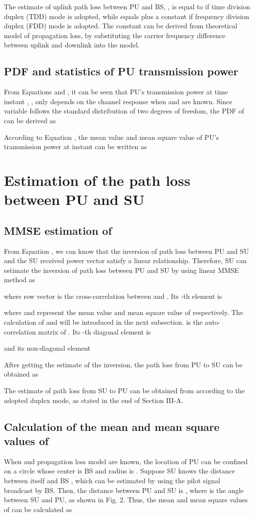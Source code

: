 \documentclass[conference]{IEEEtran}
\begin{document}
The estimate of uplink path loss between PU and BS, ,
is equal to  if time division duplex (TDD) mode is
adopted, while  equals  plus a constant if
frequency division duplex (FDD) mode is adopted. The constant can be
derived from theoretical model of propagation loss, by substituting
the carrier frequency difference between uplink and downlink into
the model.
\subsection{PDF and statistics of PU transmission power }
From Equations  and , it can be seen that PU's
transmission power at time instant , , only depends on
the channel response  when  and  are
known. Since variable  follows the
standard  distribution of two degrees of freedom, the PDF
of  can be derived as

According to Equation , the mean value  and mean
square value  of PU's transmission power at
instant  can be written as


\section{Estimation of the path loss between PU and SU}
\subsection{MMSE estimation of }
From Equation , we can know that the inversion of path loss
between PU and SU  and the SU received power vector 
satisfy a linear relationship. Therefore, SU can estimate the
inversion of path loss between PU and SU  by using linear MMSE
method \cite{c8} as

where  row vector  is the cross-correlation
between  and . Its -th element is

where  and  represent the mean value and
mean square value of  respectively. The calculation of 
and  will be introduced in the next subsection.
 is the auto-correlation matrix
of . Its -th diagonal element is

and its non-diagonal element 

After getting the estimate of the inversion, the path loss from PU
to SU can be obtained as

The estimate of path loss from SU to PU  can be
obtained from  according to the adopted duplex mode, as
stated in the end of Section III-A.

\subsection{Calculation of the mean and mean square values of }
When  and propagation loss model are known, the
location of PU can be confined on a circle whose center is BS and
radius is . Suppose SU knows the distance between itself and BS ,
 which can be estimated by using the pilot signal broadcast by BS. Then, the distance between PU and
 SU is , where
  is the angle between SU and PU, as shown in Fig. 2. Thus, the mean and mean square values of  can be calculated as
 
\end{document}
